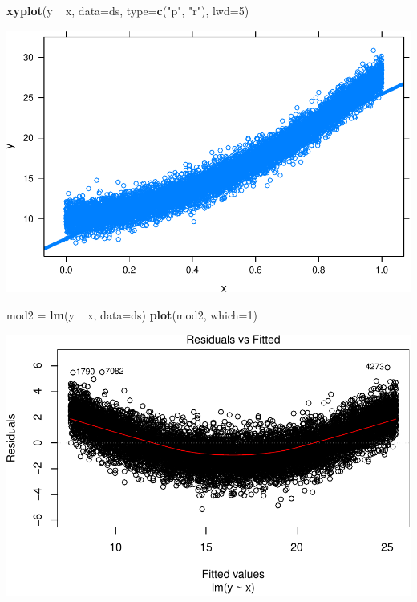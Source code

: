 \documentclass[]{article}
\newenvironment{Shaded}{\begin{snugshade}}{\end{snugshade}}
\newcommand{\KeywordTok}[1]{\textcolor[rgb]{0.13,0.29,0.53}{\textbf{{#1}}}}
\newcommand{\DataTypeTok}[1]{\textcolor[rgb]{0.13,0.29,0.53}{{#1}}}
\newcommand{\DecValTok}[1]{\textcolor[rgb]{0.00,0.00,0.81}{{#1}}}
\newcommand{\StringTok}[1]{\textcolor[rgb]{0.31,0.60,0.02}{{#1}}}
\newcommand{\NormalTok}[1]{{#1}}
\begin{document}
\begin{Shaded}
\begin{Highlighting}[]
\KeywordTok{xyplot}\NormalTok{(y ~}\StringTok{ }\NormalTok{x, }\DataTypeTok{data=}\NormalTok{ds, }\DataTypeTok{type=}\KeywordTok{c}\NormalTok{(}\StringTok{"p"}\NormalTok{, }\StringTok{"r"}\NormalTok{), }\DataTypeTok{lwd=}\DecValTok{5}\NormalTok{)}
\end{Highlighting}
\end{Shaded}

\includegraphics{02_lab_residuals_files/figure-latex/unnamed-chunk-13-1.pdf}

\begin{Shaded}
\begin{Highlighting}[]
\NormalTok{mod2 =}\StringTok{ }\KeywordTok{lm}\NormalTok{(y ~}\StringTok{ }\NormalTok{x, }\DataTypeTok{data=}\NormalTok{ds)}
\KeywordTok{plot}\NormalTok{(mod2, }\DataTypeTok{which=}\DecValTok{1}\NormalTok{)}
\end{Highlighting}
\end{Shaded}

\includegraphics{02_lab_residuals_files/figure-latex/unnamed-chunk-13-2.pdf}
\end{document}
